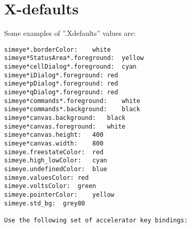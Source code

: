 \section{X-defaults}
Some examples of ''.Xdefaults'' values are:

\begin{verbatim}
simeye*.borderColor:	white
simeye*StatusArea*.foreground:	yellow
simeye*cellDialog*.foreground:	cyan
simeye*iDialog*.foreground:	red
simeye*pDialog*.foreground:	red
simeye*qDialog*.foreground:	red
simeye*commands*.foreground:	white
simeye*commands*.background:	black
simeye*canvas.background:	black
simeye*canvas.foreground:	white
simeye*canvas.height:	400
simeye*canvas.width:	800
simeye.freestateColor:	red
simeye.high_lowColor:	cyan
simeye.undefinedColor:	blue
simeye.valuesColor:	red
simeye.voltsColor:	green
simeye.pointerColor:	yellow
simeye.std_bg:	grey80

Use the following set of accelerator key bindings:


\end{verbatim}
